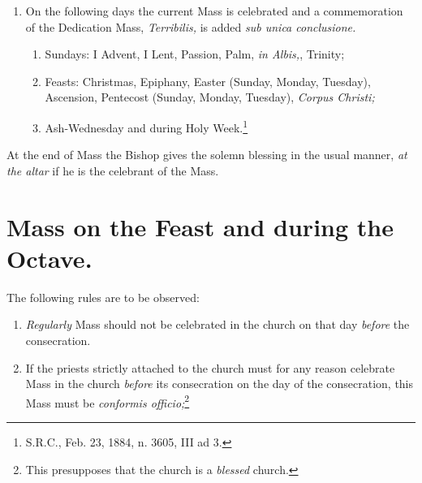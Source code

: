 \documentclass[letterpaper]{report}
\begin{document}
{\begin{enumerate}[label=(\Roman*)]
\begin{enumerate}[label=(\arabic*)]
            \item During the octaves of Epiphany, of Easter \textit{from
                Wednesday to Saturday,} of Pentecost \textit{from Wednesday to
                Saturday;}

            \item Vigils of Christmas and Pentecost.

        \end{enumerate}

    \item On the following days the current Mass is celebrated and a
        commemoration of the Dedication Mass, \textit{Terribilis,} is added
        \textit{sub unica conclusione.}

        \begin{enumerate}[label=(\arabic*)]

            \item Sundays: I Advent, I Lent, Passion, Palm, \textit{in Albis,},
                Trinity;

            \item Feasts: Christmas, Epiphany, Easter (Sunday, Monday,
                Tuesday), Ascension, Pentecost (Sunday, Monday, Tuesday),
                \textit{Corpus Christi;}

            \item Ash-Wednesday and during Holy Week.\footnote{S.R.C., Feb. 23,
                1884, n. 3605, III ad 3.}

        \end{enumerate}

\end{enumerate}

\rubric At the end of Mass the Bishop gives the solemn blessing in the usual
manner, \textit{at the altar} if he is the celebrant of the Mass.

\section{Mass on the Feast and during the Octave.}

\rubric The following rules are to be observed:

\begin{enumerate}

    \item \textit{Regularly} Mass should not be celebrated in the church on
        that day \textit{before} the consecration.
    
    \item If the priests strictly attached to the church must for any reason
        celebrate Mass in the church \textit{before} its consecration on the
        day of the consecration, this Mass must be \textit{conformis
        officio;}\footnote{This presupposes that the church is a
        \textit{blessed} church.}


\end{enumerate}}
\end{document}
